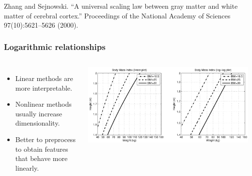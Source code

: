 \begin{frame}
\begin{columns}[c]
\end{columns}
\begin{tiny}
Zhang and Sejnowski. ``A universal scaling law between gray matter and white matter of cerebral cortex.'' Proceedings of the National Academy of Sciences 97(10):5621--5626 (2000).\par
\end{tiny}
\end{frame}

\begin{frame}
\frametitle{Logarithmic relationships}
\begin{columns}[c]
\begin{itemize}
\item Linear methods are more interpretable.
\item Nonlinear methods usually increase dimensionality.
\item Better to preprocess to obtain features that behave more linearly.
\end{itemize}
\includegraphics[width=\textwidth]{bmi}

\end{columns}
\end{frame}
